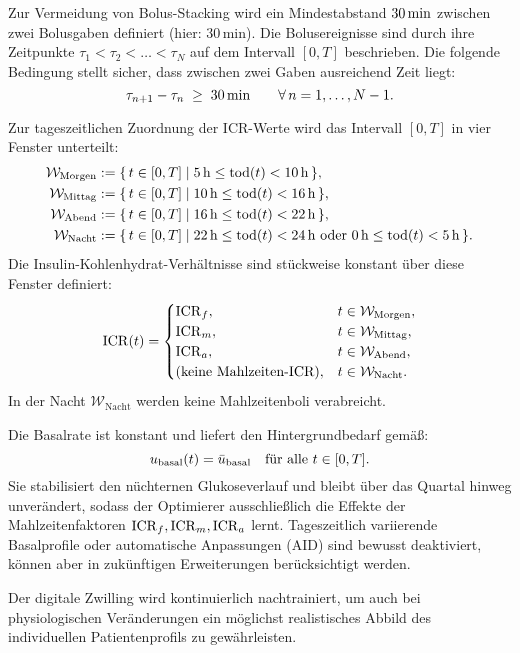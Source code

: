 Zur Vermeidung von Bolus-Stacking wird ein Mindestabstand \(30\,\mathrm{min}\) zwischen zwei Bolusgaben definiert (hier: \(30\,\mathrm{min}\)). Die Bolusereignisse sind durch ihre Zeitpunkte \(\tau_1 < \tau_2 < \dots < \tau_N\) auf dem Intervall \([0,T]\) beschrieben. Die folgende Bedingung stellt sicher, dass zwischen zwei Gaben ausreichend Zeit liegt:
\[
\tau_{n+1} - \tau_n \;\ge\; 30\,\mathrm{min} \qquad \forall\, n=1,\dots,N-1.
\]

Zur tageszeitlichen Zuordnung der ICR-Werte wird das Intervall \([0,T]\) in vier Fenster unterteilt:
\[
\begin{aligned}
\mathcal{W}_{\mathrm{Morgen}} &:= \{\, t\in[0,T] \mid 5\,\mathrm{h} \le \mathrm{tod}(t) < 10\,\mathrm{h} \,\},\\
\mathcal{W}_{\mathrm{Mittag}} &:= \{\, t\in[0,T] \mid 10\,\mathrm{h} \le \mathrm{tod}(t) < 16\,\mathrm{h} \,\},\\
\mathcal{W}_{\mathrm{Abend}}  &:= \{\, t\in[0,T] \mid 16\,\mathrm{h} \le \mathrm{tod}(t) < 22\,\mathrm{h} \,\},\\
\mathcal{W}_{\mathrm{Nacht}}  &:= \{\, t\in[0,T] \mid 22\,\mathrm{h} \le \mathrm{tod}(t) < 24\,\mathrm{h} \ \text{oder}\ 0\,\mathrm{h} \le \mathrm{tod}(t) < 5\,\mathrm{h} \,\}.
\end{aligned}
\]
Die Insulin-Kohlenhydrat-Verhältnisse sind stückweise konstant über diese Fenster definiert:
\[
\mathrm{ICR}(t)=
\begin{cases}
\mathrm{ICR}_f, & t \in \mathcal{W}_{\mathrm{Morgen}},\\
\mathrm{ICR}_m, & t \in \mathcal{W}_{\mathrm{Mittag}},\\
\mathrm{ICR}_a, & t \in \mathcal{W}_{\mathrm{Abend}},\\
\text{(keine Mahlzeiten-ICR)}, & t \in \mathcal{W}_{\mathrm{Nacht}}.
\end{cases}
\]
In der Nacht \(\mathcal{W}_{\mathrm{Nacht}}\) werden keine Mahlzeitenboli verabreicht.

Die Basalrate ist konstant und liefert den Hintergrundbedarf gemäß:
\[
u_{\mathrm{basal}}(t)=\bar u_{\mathrm{basal}} \quad \text{für alle } t \in [0,T].
\]
Sie stabilisiert den nüchternen Glukoseverlauf und bleibt über das Quartal hinweg unverändert, sodass der Optimierer ausschließlich die Effekte der Mahlzeitenfaktoren \(\mathrm{ICR}_f, \mathrm{ICR}_m, \mathrm{ICR}_a\) lernt. Tageszeitlich variierende Basalprofile oder automatische Anpassungen (AID) sind bewusst deaktiviert, können aber in zukünftigen Erweiterungen berücksichtigt werden.

Der digitale Zwilling wird kontinuierlich nachtrainiert, um auch bei physiologischen Veränderungen ein möglichst realistisches Abbild des individuellen Patientenprofils zu gewährleisten.